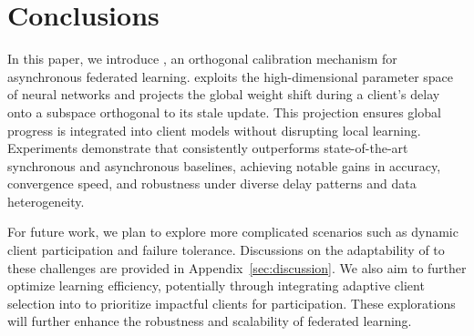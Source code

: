 \section{Conclusions}
In this paper, we introduce \our, an orthogonal calibration mechanism for asynchronous federated learning. \our exploits the high-dimensional parameter space of neural networks and projects the global weight shift during a client's delay onto a subspace orthogonal to its stale update. This projection ensures global progress is integrated into client models without disrupting local learning. Experiments demonstrate that \our consistently outperforms state-of-the-art synchronous and asynchronous baselines, achieving notable gains in accuracy, convergence speed, and robustness under diverse delay patterns and data heterogeneity.

For future work, we plan to explore more complicated scenarios such as dynamic client participation and failure tolerance. Discussions on the adaptability of \our to these challenges are provided in Appendix~\ref{sec:discussion}. We also aim to further optimize learning efficiency, potentially through integrating adaptive client selection into \our to prioritize impactful clients for participation. These explorations will further enhance the robustness and scalability of federated learning. 